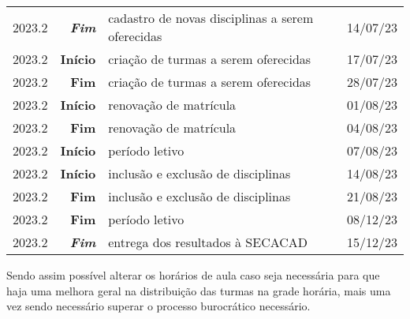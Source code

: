 \begin{table}[H]
\begin{tabular}{| c r l c |}
    2023.2            & \textbf{\textit{Fim}} & cadastro de novas disciplinas a serem oferecidas & 14/07/23      \\
    2023.2            & \textbf{Início}       & criação de turmas a serem oferecidas             & 17/07/23      \\
    2023.2            & \textbf{Fim}          & criação de turmas a serem oferecidas             & 28/07/23      \\
    2023.2            & \textbf{Início}       & renovação de matrícula                           & 01/08/23      \\
    2023.2            & \textbf{Fim}          & renovação de matrícula                           & 04/08/23      \\
    2023.2            & \textbf{Início}       & período letivo                                   & 07/08/23      \\
    2023.2            & \textbf{Início}       & inclusão e exclusão de disciplinas               & 14/08/23      \\
    2023.2            & \textbf{Fim}          & inclusão e exclusão de disciplinas               & 21/08/23      \\
    2023.2            & \textbf{Fim}          & período letivo                                   & 08/12/23      \\
    2023.2            & \textbf{\textit{Fim}} & entrega dos resultados à SECACAD                 & 15/12/23      \\

    \hline
  \end{tabular}
\end{table}

Sendo assim possível alterar os horários de aula caso seja necessária para que haja uma melhora geral na distribuição das turmas na grade horária, mais uma vez sendo necessário superar o processo burocrático necessário.

\newcommand{\altered}{\cellcolor[HTML]{79b8ff}} %
\newcommand{\removeLine}{\rowcolor[HTML]{b31d28}} %
\newcommand{\addLine}{\rowcolor[HTML]{22863a}} %

